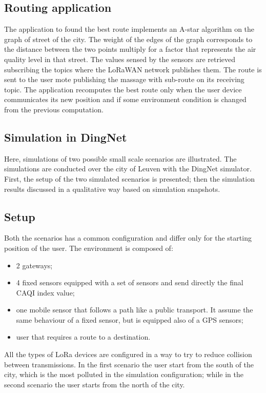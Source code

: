\subsection*{Routing application}
The application to found the best route implements an A-star algorithm on the graph of street of the city. 
The weight of the edges of the graph corresponds to the distance between the two points multiply for a factor that represents the air quality level in that street. 
The values sensed by the sensors are retrieved subscribing the topics where the LoRaWAN network publishes them. 
The route is sent to the user mote publishing the massage with sub-route on its receiving topic.
The application recomputes the best route only when the user device communicates its new position and if some environment condition is changed from the previous computation.

\subsection{Simulation in DingNet}
Here, simulations of two possible small scale scenarios are illustrated. 
The simulations are conducted over the city of Leuven with the DingNet simulator.
First, the setup of the two simulated scenarios is presented; then the simulation results discussed in a qualitative way based on simulation snapshots.

\subsection*{Setup}
Both the scenarios has a common configuration and differ only for the starting position of the user.
The environment is composed of:
\begin{itemize}
    \item 2 gateways;
    \item 4 fixed sensors equipped with a set of sensors and send directly the final CAQI index value;
    \item one mobile sensor that follows a path like a public transport. It assume the same behaviour of a fixed sensor, but is equipped also of a GPS sensors;
    \item user that requires a route to a destination.
\end{itemize} 
All the types of LoRa devices are configured in a way to try to reduce collision between transmissions.
In the first scenario the user start from the south of the city, which is the most polluted in the simulation configuration; while in the second scenario the user starts from the north of the city.

